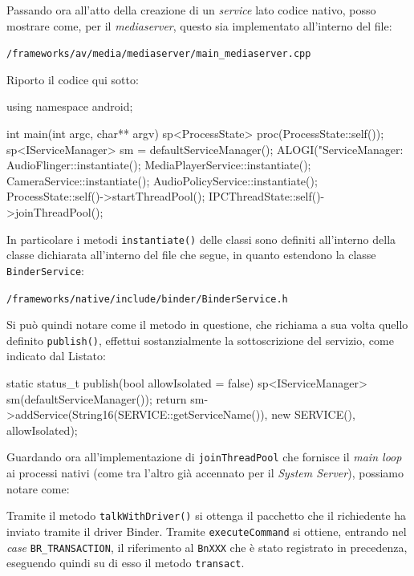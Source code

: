 Passando ora all'atto della creazione di un \textit{service} lato codice nativo, 
posso mostrare come, per il \textit{mediaserver}, questo sia implementato 
all'interno del file:
	\begin{center}
	\texttt{\small \AOSP/frameworks/av/media/mediaserver/main\_mediaserver.cpp}
	\end{center}
	Riporto il codice qui sotto:
\begin{cpp}
using namespace android;

int main(int argc, char** argv)
{
    sp<ProcessState> proc(ProcessState::self());
    sp<IServiceManager> sm = defaultServiceManager();
    ALOGI("ServiceManager: %
    AudioFlinger::instantiate();
    MediaPlayerService::instantiate();
    CameraService::instantiate();
    AudioPolicyService::instantiate();
    ProcessState::self()->startThreadPool();
    IPCThreadState::self()->joinThreadPool();
}
\end{cpp}

	In particolare i metodi \texttt{\small instantiate()} delle classi
	sono definiti all'interno della classe dichiarata all'interno
	del file che segue, in quanto estendono la classe \texttt{\small BinderService}:
	\begin{center}
	\texttt{\small \AOSP/frameworks/native/include/binder/BinderService.h}
	\end{center}
	Si può quindi notare come il metodo in questione, che richiama a sua
	volta quello definito \texttt{\small publish()}, effettui sostanzialmente
	la sottoscrizione del servizio, come indicato dal Listato:
\begin{cpp}
static status_t publish(bool allowIsolated = false) {
        sp<IServiceManager> sm(defaultServiceManager());
        return sm->addService(String16(SERVICE::getServiceName()), new SERVICE(), allowIsolated);
}
\end{cpp}

Guardando ora all'implementazione di \texttt{\small joinThreadPool} che fornisce il
\textit{main loop} ai processi nativi (come tra l'altro già accennato per il 
\textit{System Server}), possiamo notare come:
\begin{itemize}
\diam Tramite il metodo \texttt{\small talkWithDriver()} si ottenga il pacchetto 
	che il richiedente ha inviato tramite il driver Binder.
\diam Tramite \texttt{\small executeCommand} si ottiene, entrando nel \textit{case}
	\texttt{\small BR\_TRANSACTION}, il riferimento al \texttt{\small BnXXX}
	che è stato registrato in precedenza, eseguendo quindi su di esso il
	metodo \texttt{\small transact}. 
\end{itemize}

